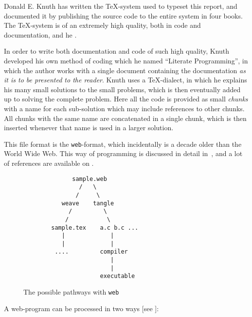  Donald E. Knuth has written the {\TeX}-system used to typeset this
report, and documented it by publishing the source code to the entire
system in four books.  The {\TeX}-system is of an extremely high
quality, both in code and documentation, and he
.

In order to write both documentation and code of such high quality,
Knuth developed his own method of coding which he named ``Literate
Programming'', in which the author works with a single document
containing the documentation \textit{as it is to be presented to the
reader}.  Knuth uses a {\TeX}-dialect, in which he explains his many
small solutions to the small problems, which is then eventually added
up to solving the complete problem.  Here all the code is provided as
small \textit{chunks} with a name for each sub-solution which may
include references to other chunks.  All chunks with the same name are
concatenated in a single chunk, which is then inserted whenever that
name is used in a larger solution.

This file format is the \texttt{web}-format, which incidentally is a
decade older than the World Wide Web.  This way of programming is
discussed in detail in~\cite{sewell:weaving-a-program}, and a lot of
references are available on
.

\begin{figure}[htbp]
  \begin{center}
\begin{verbatim}
              sample.web
                /   \
               /     \
           weave    tangle
             /         \
            /           \
        sample.tex    a.c b.c ...
           |             |
           |             |
         ....         compiler
                         |
                         |
                      executable
\end{verbatim}
    \caption{The possible pathways with \texttt{web}}
    \label{fig:web-pathways}
  \end{center}
\end{figure}


A web-program can be processed in two ways [see ]:

